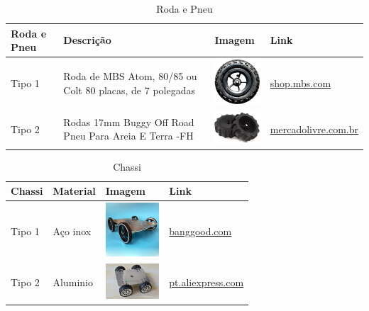   \begin{table}[!htbp]
  \begin{center}
  \caption{Roda e Pneu}
  \begin{tabular}{|p{2cm}|p{3cm}|p{2cm}|p{4cm}|}
  \hline
  \textbf{Roda e Pneu} & \textbf{Descrição} & \textbf{Imagem} & \textbf{Link}\\\hline\hline
  Tipo 1 & Roda de MBS Atom, 80/85 ou Colt 80 placas, de 7 polegadas & \includegraphics[width=2cm]{figuras/roda_mbs.eps} & \href{http://shop.mbs.com/accessories-488/mountainboard-wheels/complete-wheels/complete-7-wheel.html}{shop.mbs.com}\\\hline
  Tipo 2 & Rodas 17mm Buggy Off Road Pneu Para Areia E Terra -FH & \includegraphics[width=2cm]{figuras/roda_buggy.eps} & \href{http://produto.mercadolivre.com.br/MLB-788601174-par-de-rodas-17mm-buggy-off-road-pneu-para-areia-e-terra-fh-_JM}{mercadolivre.com.br}\\\hline
  \end{tabular}
  \end{center}
  \end{table}

  \begin{table}[!htbp]
  \begin{center}
  \caption{Chassi}
  \begin{tabular}{|p{2cm}|p{3cm}|p{2cm}|p{4cm}|}
  \hline
  \textbf{Chassi} & \textbf{Material} & \textbf{Imagem} & \textbf{Link}\\\hline\hline
  Tipo 1 & Aço inox & \includegraphics[width=2cm]{figuras/chassi_inox.eps} & \href{http://www.banggood.com/pt/DIY-C600-DIY-Remote-Control-Crawler-Chassis-Smart-Track-Stainless-Stell-Metal-Tank-p-1079216.html}{banggood.com}\\\hline
  Tipo 2 & Aluminio & \includegraphics[width=2cm]{figuras/chassi_aluminio.eps} & \href{https://pt.aliexpress.com/store/product/New-25-aluminum-alloy-tracking-robot-tank-chassi-car-4WD-metal-tank-car-chassis-for-DIY/421824_32294898374.html}{pt.aliexpress.com}\\\hline
  \end{tabular}
  \end{center}
  \end{table}

